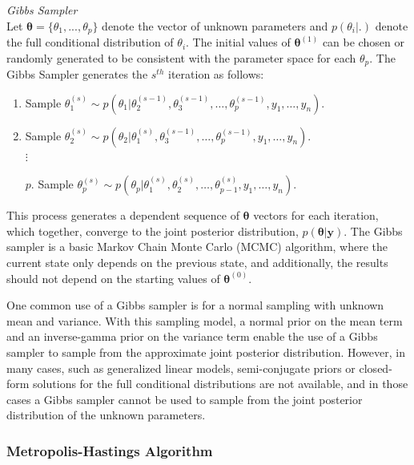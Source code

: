 \documentclass[12pt]{article}\usepackage[]{graphicx}\usepackage[]{color}
\begin{document}
\newpage
\begin{mdframed}
\textit{Gibbs Sampler} \\
Let $\bm{\theta} = \{\theta_1, ..., \theta_p\}$ denote the vector of unknown parameters and $p(\theta_i|.)$ denote the full conditional distribution of $\theta_i$. The initial values of $\bm{\theta}^{(1)}$ can be chosen or randomly generated to be consistent with the parameter space for each $\theta_p$. The Gibbs Sampler generates the $s^{th}$ iteration as follows:
\begin{enumerate}
\item Sample $\theta_1^{(s)} \sim p(\theta_1|\theta_2^{(s-1)}, \theta_3^{(s-1)}, \dots, \theta_p^{(s-1)}, y_1, \dots, y_n)$. 
\item Sample $\theta_2^{(s)} \sim p(\theta_2|\theta_1^{(s)}, \theta_3^{(s-1)}, \dots, \theta_p^{(s-1)}, y_1, \dots, y_n)$.\\	
$\vdots$ \\[-14mm]
\item[$p$.] Sample $\theta_p^{(s)} \sim p(\theta_p|\theta_1^{(s)}, \theta_2^{(s)}, \dots, \theta_{p-1}^{(s)}, y_1, \dots , y_n)$. 
\end{enumerate}
\end{mdframed}

\noindent This process generates a dependent sequence of $\bm{\theta}$ vectors for each iteration, which together, converge to the joint posterior distribution, $p(\bm{\theta}|\bm{y})$. The Gibbs sampler is a basic Markov Chain Monte Carlo (MCMC) algorithm, where the current state only depends on the previous state, and additionally, the results should not depend on the starting values of $\bm{\theta}^{(0)}$.

One common use of a Gibbs sampler is for a normal sampling with unknown mean and variance. With this sampling model, a normal prior on the mean term and an inverse-gamma prior on the variance term enable the use of a Gibbs sampler to sample from the approximate joint posterior distribution. However, in many cases, such as generalized linear models, semi-conjugate priors or closed-form solutions for the full conditional distributions are not available, and in those cases a Gibbs sampler cannot be used to sample from the joint posterior distribution of the unknown parameters. 

\subsubsection{Metropolis-Hastings Algorithm}
\end{document}
